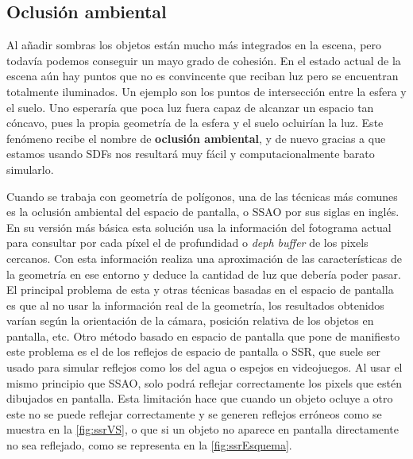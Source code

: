 \subsection{Oclusión ambiental}\label{sec:ao}
Al añadir sombras los objetos están mucho más integrados en la escena, pero todavía podemos conseguir un mayo grado de cohesión. En el estado actual de la escena aún hay puntos que no es convincente que reciban luz pero se encuentran totalmente iluminados. Un ejemplo son los puntos de intersección entre la esfera y el suelo. Uno esperaría que poca luz fuera capaz de alcanzar un espacio tan cóncavo, pues la propia geometría de la esfera y el suelo ocluirían la luz. Este fenómeno recibe el nombre de \textbf{oclusión ambiental}, y de nuevo gracias a que estamos usando SDFs nos resultará muy fácil y computacionalmente barato simularlo.\newline

Cuando se trabaja con geometría de polígonos, una de las técnicas más comunes es la oclusión ambiental del espacio de pantalla, o SSAO por sus siglas en inglés. En su versión más básica esta solución usa la información del fotograma actual para consultar por cada píxel el  de profundidad o \textit{deph buffer} de los pixels cercanos. Con esta información realiza una aproximación de las características de la geometría en ese entorno y deduce la cantidad de luz que debería poder pasar. El principal problema de esta y otras técnicas basadas en el espacio de pantalla es que al no usar la información real de la geometría, los resultados obtenidos varían según la orientación de la cámara, posición relativa de los objetos en pantalla, etc. Otro método basado en espacio de pantalla que pone de manifiesto este problema es el de los reflejos de espacio de pantalla o SSR, que suele ser usado para simular reflejos como los del agua o espejos en videojuegos. Al usar el mismo principio que SSAO, solo podrá reflejar correctamente los pixels que estén dibujados en pantalla. Esta limitación hace que cuando un objeto ocluye a otro este no se puede reflejar correctamente y se generen reflejos erróneos como se muestra en la \autoref{fig:ssrVS}, o que si un objeto no aparece en pantalla directamente no sea reflejado, como se representa en la \autoref{fig:ssrEsquema}.

